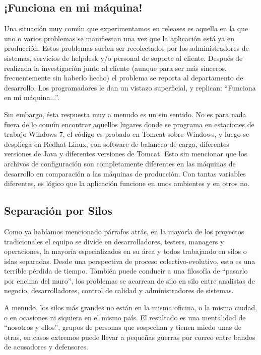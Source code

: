 \documentclass[conference]{IEEEtran}
\begin{document}
\subsection{¡Funciona en mi máquina!}

Una situación muy común que experimentamos en releases es aquella en la que uno o varios problemas se manifiestan una vez que la aplicación está ya en producción. Estos problemas suelen ser recolectados por los administradores de sistemas, servicios de helpdesk y/o personal de soporte al cliente. Después de realizada la investigación junto al cliente (aunque para ser más sinceros, frecuentemente sin haberlo hecho) el problema se reporta al departamento de desarrollo. Los programadores le dan un vistazo superficial, y replican: “Funciona en mi máquina...”.

Sin embargo, ésta respuesta muy a menudo es un sin sentido. No es para nada fuera de lo común encontrar aquellos lugares donde se programa en estaciones de trabajo Windows 7,  el código es probado en Tomcat sobre Windows, y luego se despliega en Redhat Linux, con software de balanceo de carga, diferentes versiones de Java y diferentes versiones de Tomcat. Esto sin mencionar que los archivos de configuración son completamente diferentes en las máquinas de desarrollo en comparación a las máquinas de producción. Con tantas variables diferentes, es lógico que la aplicación funcione en unos ambientes y en otros no.

\subsection{Separación por Silos}

Como ya habíamos mencionado párrafos atrás, en la mayoría de los proyectos tradicionales el equipo se divide en desarrolladores, testers, managers y operaciones, la mayoría especializados en su área y todos trabajando en silos o islas separadas. Desde una perspectiva de proceso colectivo-evolutivo, esto es una terrible pérdida de tiempo. También puede conducir a una filosofía de “pasarlo por encima del muro”, los problemas se acarrean de silo en silo entre analistas de negocio, desarrolladores, control de calidad y administradores de sistemas. 

A menudo, los silos más grandes no están en la misma oficina, o la misma ciudad, o en ocasiones ni siquiera en el mismo país. El resultado es una  mentalidad de “nosotros y ellos”, grupos de personas que sospechan y tienen miedo unas de otras, en casos extremos puede llevar a pequeñas guerras por correo entre bandos de acusadores y defensores.
\end{document}
